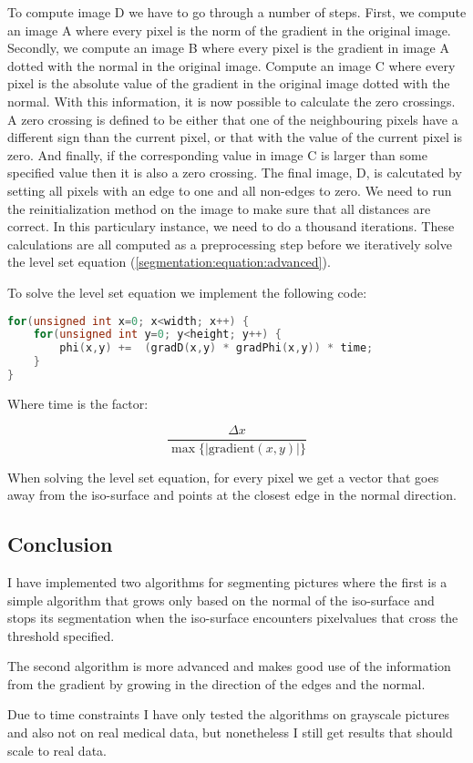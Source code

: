 To compute image D we have to go through a number of steps. First, we
compute an image A where every pixel is the norm of the gradient in
the original image. Secondly, we compute an image B where every pixel
is the gradient in image A dotted with the normal in the original
image. Compute an image C where every pixel is the absolute value of
the gradient in the original image dotted with the normal.  With this
information, it is now possible to calculate the zero crossings. A
zero crossing is defined to be either that one of the neighbouring
pixels have a different sign than the current pixel, or that with the
value of the current pixel is zero. And finally, if the corresponding
value in image C is larger than some specified value then it is also a
zero crossing. The final image, D, is calcutated by setting all pixels
with an edge to one and all non-edges to zero. We need to run the
reinitialization method on the image to make sure that all distances
are correct. In this particulary instance, we need to do a thousand
iterations. These calculations are all computed as a preprocessing
step before we iteratively solve the level set equation
(\vref*{segmentation:equation:advanced}).

To solve the level set equation we implement the following code:
\begin{lstlisting}[language=c++]
for(unsigned int x=0; x<width; x++) {
    for(unsigned int y=0; y<height; y++) {
        phi(x,y) +=  (gradD(x,y) * gradPhi(x,y)) * time;
    }
}
\end{lstlisting}

Where time is the factor:

\begin{equation*}
  \dfrac{\Delta x} {\max \{|\textrm{gradient}(x,y)|\}} 
\end{equation*}

When solving the level set equation, for every pixel we get a vector
that goes away from the iso-surface and points at the closest edge in
the normal direction.

\subsection{Conclusion}
\label{segmentation:conclusion}

I have implemented two algorithms for segmenting pictures where the
first is a simple algorithm that grows only based on the normal of the
iso-surface and stops its segmentation when the iso-surface encounters
pixelvalues that cross the threshold specified.

The second algorithm is more advanced and makes good use of the
information from the gradient by growing in the direction of the edges
and the normal.

Due to time constraints I have only tested the algorithms on grayscale
pictures and also not on real medical data, but nonetheless I still
get results that should scale to real data.

